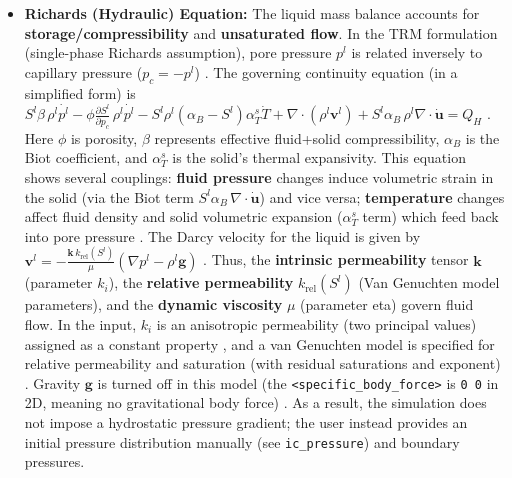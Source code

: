 \documentclass[10pt,a4paper]{article}
\begin{document}
\begin{itemize}
    \item \textbf{Richards (Hydraulic) Equation:} The liquid mass balance accounts for \textbf{storage/compressibility} and \textbf{unsaturated flow}. In the TRM formulation (single-phase Richards assumption), pore pressure $p^l$ is related inversely to capillary pressure ($p_c = -p^l$) \cite{ogs:trm}. The governing continuity equation (in a simplified form) is $S^l \beta\,\rho^l \dot{p^l} - \phi \frac{\partial S^l}{\partial p_c}\,\rho^l \dot{p^l} - S^l \rho^l(\alpha_B - S^l)\alpha_T^s \dot{T} + \nabla\cdot(\rho^l \mathbf{v}^l) + S^l \alpha_B\,\rho^l \nabla\cdot \dot{\mathbf{u}} = Q_H$ \cite{ogs:trm}. Here $\phi$ is porosity, $\beta$ represents effective fluid+solid compressibility, $\alpha_B$ is the Biot coefficient, and $\alpha_T^s$ is the solid's thermal expansivity. This equation shows several couplings: \textbf{fluid pressure} changes induce volumetric strain in the solid (via the Biot term $S^l\alpha_B\,\nabla\cdot\dot{\mathbf{u}}$) and vice versa; \textbf{temperature} changes affect fluid density and solid volumetric expansion ($\alpha_T^s$ term) which feed back into pore pressure \cite{ogs:trm}. The Darcy velocity for the liquid is given by $\mathbf{v}^l = -\frac{\mathbf{k}\,k_{\text{rel}}(S^l)}{\mu}\left(\nabla p^l - \rho^l \mathbf{g}\right)$ \cite{ogs:trm}. Thus, the \textbf{intrinsic permeability} tensor $\mathbf{k}$ (parameter $k_i$), the \textbf{relative permeability} $k_{\text{rel}}(S^l)$ (Van Genuchten model parameters), and the \textbf{dynamic viscosity} $\mu$ (parameter eta) govern fluid flow. In the input, $k_i$ is an anisotropic permeability (two principal values) assigned as a constant property \cite{file:04_media_TRM}, and a van Genuchten model is specified for relative permeability and saturation (with residual saturations and exponent) \cite{file:04_2_media_twophase}. Gravity $\mathbf{g}$ is turned off in this model (the \texttt{<specific\_body\_force>} is \texttt{0 0} in 2D, meaning no gravitational body force) \cite{file:01_processes_TRM}. As a result, the simulation does not impose a hydrostatic pressure gradient; the user instead provides an initial pressure distribution manually (see \texttt{ic\_pressure}) and boundary pressures.


\end{itemize}
\end{document}
